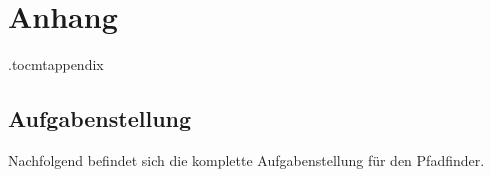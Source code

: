 \documentclass[../main.tex]{subfiles}
\begin{document}
\newpage
{}
\chapter*{Anhang}
\etocdepthtag.toc{mtappendix}
\addtableofcontents


\section{Aufgabenstellung} \label{aufgabenstellung}

Nachfolgend befindet sich die komplette Aufgabenstellung für den Pfadfinder.


\end{document}
